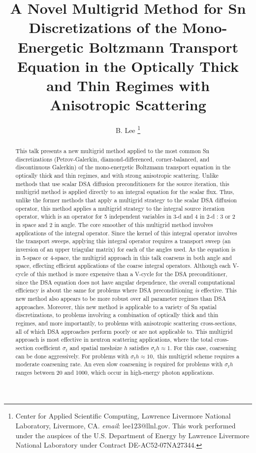 \documentclass[10pt]{siamltex}
\begin{document}
\title{A Novel Multigrid Method for Sn Discretizations of the Mono-Energetic Boltzmann Transport Equation
in the Optically Thick and Thin Regimes with Anisotropic Scattering}
\author{B. Lee
\thanks{Center for Applied Scientific Computing, Lawrence Livermore National Laboratory, 
Livermore, CA. {\it email}: lee123@llnl.gov. This work performed under the auspices of the U.S. Department 
of Energy by Lawrence Livermore National Laboratory under Contract DE-AC52-07NA27344.}}
\date{}
\maketitle

\begin{abstract}
This talk presents a new multigrid method applied to the most common Sn discretizations 
(Petrov-Galerkin, diamond-differenced, corner-balanced, and discontinuous Galerkin) of
the mono-energetic Boltzmann transport equation in the optically thick and thin regimes, and
with strong anisotropic scattering. Unlike methods that use scalar DSA diffusion preconditioners 
for the source iteration, this multigrid method is applied directly to an integral equation for the 
scalar flux. Thus, unlike the former methods that apply a multigrid strategy to the scalar DSA 
diffusion operator, this method applies a multigrid strategy to the integral source iteration
operator, which is an operator for 5 independent variables in 3-d and 4 in 2-d : 3 or 2 in space 
and 2 in angle. The core smoother of this multigrid method involves applications
of the integral operator. Since the kernel of this integral operator involves 
the transport sweeps, applying this integral operator requires a transport sweep
(an inversion of an upper triagular matrix) for each of the angles used. As the equation is in 
5-space or 4-space, the multigrid approach in this talk coarsens in both angle and space,
effecting efficient applications of the coarse integral operators. Although each V-cycle
of this method is more expensive than a V-cycle for the DSA preconditioner, since the DSA equation 
does not have angular dependence, the overall computational efficiency is about
the same for problems where DSA preconditioning {\it is} effective. This new method also appears
to be more robust over all parameter regimes than DSA approaches. Moreover, this new method is 
applicable to a variety of Sn spatial discretizations, to problems involving a combination
of optically thick and thin regimes, and more importantly, to problems with anisotropic
scattering cross-sections, all of which DSA approaches perform poorly or are not applicable to.
This multigrid approach is most effective in neutron scattering applications, where the total 
cross-section coefficient $\sigma_t$ and spatial meshsize $h$ satisfies $\sigma_t h\approx 1.$
For this case, coarsening can be done aggressively. For problems with $\sigma_t h\approx 10,$ this
multigrid scheme requires a moderate coarsening rate. An even slow coarsening is required
for problems with $\sigma_t h$ ranges between 20 and 1000, which occur in high-energy photon applications.
\end{abstract}
\end{document}

